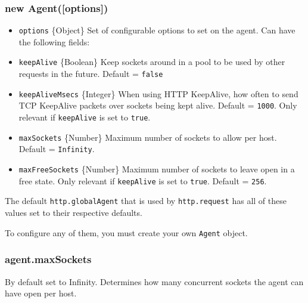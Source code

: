 \subsubsection{new Agent({[}options{]})}

\begin{itemize}
\item
  \texttt{options} \{Object\} Set of configurable options to set on the
  agent. Can have the following fields:
\item
  \texttt{keepAlive} \{Boolean\} Keep sockets around in a pool to be
  used by other requests in the future. Default = \texttt{false}
\item
  \texttt{keepAliveMsecs} \{Integer\} When using HTTP KeepAlive, how
  often to send TCP KeepAlive packets over sockets being kept alive.
  Default = \texttt{1000}. Only relevant if \texttt{keepAlive} is set to
  \texttt{true}.
\item
  \texttt{maxSockets} \{Number\} Maximum number of sockets to allow per
  host. Default = \texttt{Infinity}.
\item
  \texttt{maxFreeSockets} \{Number\} Maximum number of sockets to leave
  open in a free state. Only relevant if \texttt{keepAlive} is set to
  \texttt{true}. Default = \texttt{256}.
\end{itemize}

The default \texttt{http.globalAgent} that is used by
\texttt{http.request} has all of these values set to their respective
defaults.

To configure any of them, you must create your own \texttt{Agent}
object.

\begin{Shaded}
\begin{Highlighting}[]
 \NormalTok{);}
  \NormalTok{(\{ }\NormalTok{: } \NormalTok{\});}
\end{Highlighting}
\end{Shaded}

\subsubsection{agent.maxSockets}

By default set to Infinity. Determines how many concurrent sockets the
agent can have open per host.

